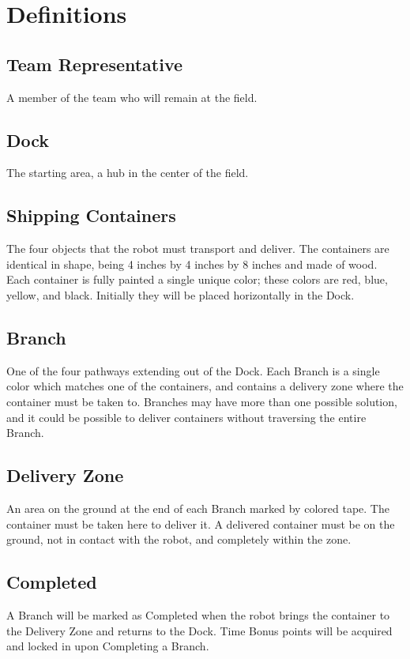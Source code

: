 \section{Definitions}

\subsection{Team Representative}
A member of the team who will remain at the field.

\subsection{Dock}
The starting area, a hub in the center of the field. 

\subsection{Shipping Containers}
The four objects that the robot must transport and deliver. The containers are identical in shape, being 4 inches by 4 inches by 8 inches and made of wood. Each container is fully painted a single unique color; these colors are red, blue, yellow, and black. Initially they will be placed horizontally in the Dock. 

\subsection{Branch}
One of the four pathways extending out of the Dock. Each Branch is a single color which matches one of the containers, and contains a delivery zone where the container must be taken to. Branches may have more than one possible solution, and it could be possible to deliver containers without traversing the entire Branch. 

\subsection{Delivery Zone}
An area on the ground at the end of each Branch marked by colored tape. The container must be taken here to deliver it. A delivered container must be on the ground, not in contact with the robot, and completely within the zone. 

\subsection{Completed}
A Branch will be marked as Completed when the robot brings the container to the Delivery Zone and returns to the Dock. Time Bonus points will be acquired and locked in upon Completing a Branch.
